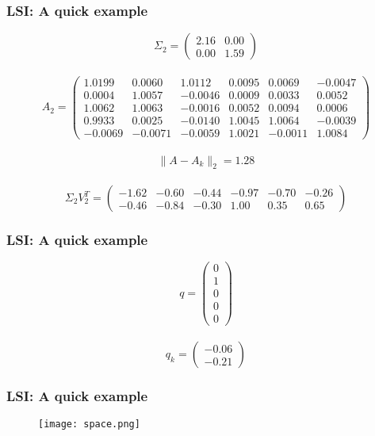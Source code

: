 \begin{frame}[plain]
\frametitle{LSI: A quick example}
\begin{equation}
 \Sigma_{2} =
\begin{pmatrix}
 2.16 & 0.00 \\
 0.00 & 1.59 \end{pmatrix}
\end{equation}
\\
\begin{equation}
A_{2} = \begin{pmatrix}
    1.0199 &   0.0060 &   1.0112 &   0.0095 &   0.0069 &  -0.0047 \\
    0.0004 &   1.0057 &  -0.0046 &   0.0009 &   0.0033 &   0.0052 \\
    1.0062 &   1.0063 &  -0.0016 &   0.0052 &   0.0094 &   0.0006 \\
    0.9933 &   0.0025 &  -0.0140 &   1.0045 &   1.0064 &  -0.0039 \\
   -0.0069 &  -0.0071 &  -0.0059 &   1.0021 &  -0.0011 &   1.0084 \end{pmatrix}
\end{equation}
\\
\begin{equation}
\|A - A_{k}\|_{2} = 1.28
\end{equation}
\\
\begin{equation}
\Sigma_{2} V_{2}^{T} = \begin{pmatrix}
 -1.62 & -0.60 & -0.44 & -0.97 & -0.70 & -0.26\\
 -0.46 & -0.84 & -0.30 &  1.00 &  0.35 &  0.65 \end{pmatrix} 
\end{equation}
\end{frame}
\begin{frame}[plain]
\frametitle{LSI: A quick example}
\begin{equation}
q = \begin{pmatrix}0\\1\\0\\0\\0\end{pmatrix}
\end{equation}\
\\
\begin{equation}
q_{k} = \begin{pmatrix}-0.06\\-0.21\end{pmatrix}
\end{equation}
\end{frame}
\begin{frame}[plain]
\frametitle{LSI: A quick example}
\begin{center}
  \begin{figure}[H]
    \centering
    \texttt{[image: space.png]}
    \label{fig:spaces}
  \end{figure}
\end{center}
\end{frame}

